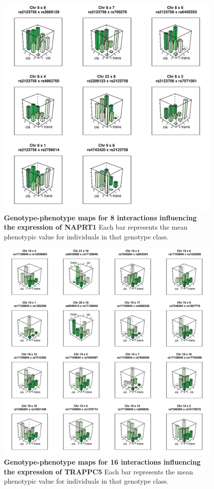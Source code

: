 \documentclass{article}
\begin{document}
\begin{figure}
	\centering
	\includegraphics[width=5in]{NAPRT1_3D}
	\caption{\textbf{Genotype-phenotype maps for 8 interactions influencing the expression of NAPRT1} Each bar represents the mean phenotypic value for individuals in that genotype class.}
	\label{fig:NAPRT1_3D}
\end{figure}
\clearpage

\begin{figure}
	\centering
	\includegraphics[width=5in]{TRAPPC5_3D}
	\caption{\textbf{Genotype-phenotype maps for 16 interactions influencing the expression of TRAPPC5} Each bar represents the mean phenotypic value for individuals in that genotype class.}
	\label{fig:TRAPPC5_3D}
\end{figure}
\clearpage
\end{document}
